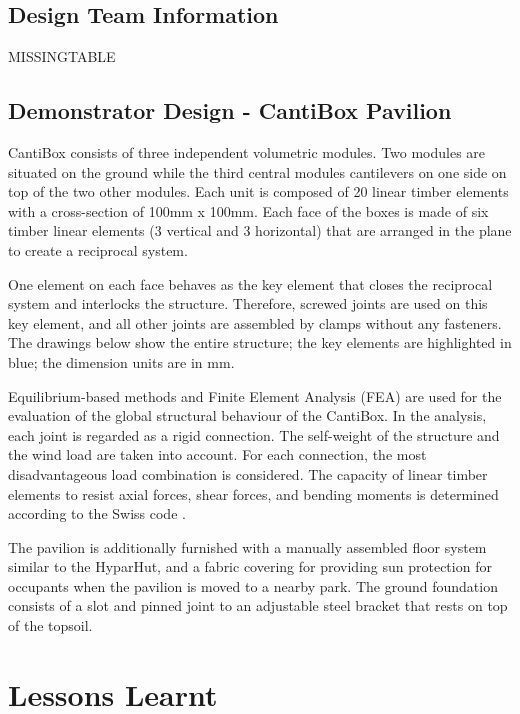 \subsection{Design Team Information}

MISSINGTABLE

\subsection{Demonstrator Design - CantiBox Pavilion}

CantiBox consists of three independent volumetric modules. Two modules are situated on the ground while the third central modules cantilevers on one side on top of the two other modules. Each unit is composed of 20 linear timber elements with a cross-section of 100mm x 100mm. Each face of the boxes is made of six timber linear elements (3 vertical and 3 horizontal) that are arranged in the plane to create a reciprocal system. 




One element on each face behaves as the key element that closes the reciprocal system and interlocks the structure. Therefore, screwed joints are used on this key element, and all other joints are assembled by clamps without any fasteners. The drawings below show the entire structure; the key elements are highlighted in blue; the dimension units are in mm. 




Equilibrium-based methods and Finite Element Analysis (FEA) are used for the evaluation of the global structural behaviour of the CantiBox. In the analysis, each joint is regarded as a rigid connection. The self-weight of the structure and the wind load are taken into account. For each connection, the most disadvantageous load combination is considered. The capacity of linear timber elements to resist axial forces, shear forces, and bending moments is determined according to the Swiss code \parencite{swissstandardsassociationSIA265Timber2003}.

The pavilion is additionally furnished with a manually assembled floor system similar to the HyparHut, and a fabric covering for providing sun protection for occupants when the pavilion is moved to a nearby park. The ground foundation consists of a slot and pinned joint to an adjustable steel bracket that rests on top of the topsoil.



\section{Lessons Learnt}


